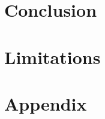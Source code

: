 \documentclass[11pt]{article}
\begin{document}
\section{Conclusion}

\section{Limitations}



\appendix

\section{Appendix}
\label{sec:appendix}
\end{document}
